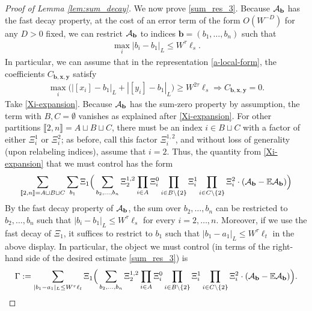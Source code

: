 \begin{proof}[Proof of Lemma \ref{lem:sum_decay}]
{We now prove \eqref{sum_res_3}. Because ${\cal A}_{\textbf{b}}$ has the fast decay property, at the cost of an error term of the form $O(W^{-D})$ for any $D>0$ fixed, we can restrict ${\cal A}_{\textbf{b}}$ to indices $\textbf{b}=(b_{1},\ldots,b_{n})$ such that 
%
\begin{align*}
\max_{i}|b_{i}-b_{1}|_{L}\leq W^{\tau}\ell_{s}.
\end{align*}
%
In particular, we can assume that in the representation \eqref{a-local-form}, the coefficients $C_{\textbf{b},\textbf{x},\textbf{y}}$ satisfy
%
\begin{align}
\max_{i}\Big(|[x_{i}]-b_{1}|_{L}+|[y_{i}]-b_{1}|_{L}\Big)\geq W^{2\tau}\ell_{s} \Rightarrow C_{\textbf{b},\textbf{x},\textbf{y}}=0.\label{c-decay-new}
\end{align}
%
Take \eqref{Xi-expansion}. Because ${\cal A}_{\textbf{b}}$ has the sum-zero property by assumption, the term with $B,C=\emptyset$ vanishes as explained after \eqref{Xi-expansion}. For other partitions $\llbracket2,n\rrbracket=A\sqcup B\sqcup C$, there must be an index $i\in B\sqcup C$ with a factor of either $\Xi^{1}_{i}$ or $\Xi^{2}_{i}$; as before, call this factor $\Xi^{1,2}_{i}$, and without loss of generality (upon relabeling indices), assume that $i=2$. Thus, the quantity from \eqref{Xi-expansion} that we must control has the form
%
\begin{align*}
\sum_{\llbracket2,n\rrbracket=A\sqcup B\sqcup C}\sum_{b_{1}}\Xi_{1}\Big(\sum_{b_{2},\ldots,b_{n}}\Xi^{1,2}_{2}\prod_{i\in A}\Xi^{0}_{i}\prod_{i\in B\setminus\{2\}}\Xi^{1}_{i}\prod_{i\in C\setminus\{2\}}\Xi^{2}_{i}\cdot ({\cal A}_{\textbf{b}}-\mathbb{E}{\cal A}_{\textbf{b}})\Big)
\end{align*}
%
By the fast decay property of ${\cal A}_{\textbf{b}}$, the sum over $b_{2},\ldots,b_{n}$ can be restricted to $b_{2},\ldots,b_{n}$ such that $|b_{i}-b_{1}|_{L}\leq W^{\tau}\ell_{s}$ for every $i=2,\ldots,n$. Moreover, if we use the fast decay of $\Xi_{1}$, it suffices to restrict to $b_{1}$ such that $|b_{1}-a_{1}|_{L}\leq W^{\tau}\ell_{t}$ in the above display. In particular, the object we must control (in terms of the right-hand side of the desired estimate \eqref{sum_res_3}) is
%
\begin{align}
    \Gamma:=\sum_{|b_{1}-a_{1}|_{L}\leq W^{\tau}\ell_{t}}\Xi_{1}\Big(\sum_{b_{2},\ldots,b_{n}}\Xi^{1,2}_{2}\prod_{i\in A}\Xi^{0}_{i}\prod_{i\in B\setminus\{2\}}\Xi^{1}_{i}\prod_{i\in C\setminus\{2\}}\Xi^{2}_{i}\cdot ({\cal A}_{\textbf{b}}-\mathbb{E}{\cal A}_{\textbf{b}})\Big).\label{gamma_def_clt}
\end{align}
}
\end{proof}
